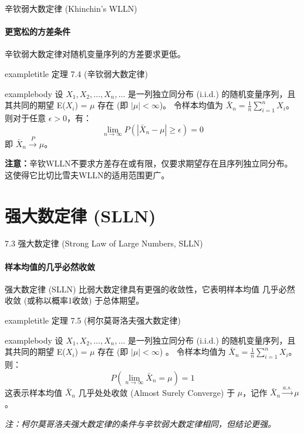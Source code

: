 \documentclass[UTF8]{beamer} %
\begin{document}
\begin{frame}{辛钦弱大数定律 (Khinchin's WLLN)}
    \framesubtitle{更宽松的方差条件}
    辛钦弱大数定律对随机变量序列的方差要求更低。
    \vspace{0.3cm}
    \begin{beamercolorbox}[sep=0.3cm,center,wd=\textwidth]{exampletitle}
        定理 7.4 (辛钦弱大数定律)
    \end{beamercolorbox}
    \begin{beamercolorbox}[sep=0.3cm,wd=\textwidth]{examplebody}
        设 $X_1, X_2, \dots, X_n, \dots$ 是一列\alert{独立同分布 (i.i.d.)} 的随机变量序列，且其共同的期望 E($X_i$) = $\mu$ \alert{存在} (即 $|\mu| < \infty$)。
        令样本均值为 $\bar{X}_n = \frac{1}{n} \sum_{i=1}^{n} X_i$。
        则对于任意 $\epsilon > 0$，有：
        \[ \lim_{n \to \infty} P(|\bar{X}_n - \mu| \geq \epsilon) = 0 \]
        即 $\bar{X}_n \xrightarrow{P} \mu$。
    \end{beamercolorbox}
    \vspace{0.3cm}
    \textbf{注意：}辛钦WLLN不要求方差存在或有限，仅要求期望存在且序列独立同分布。这使得它比切比雪夫WLLN的适用范围更广。
\end{frame}


\section{强大数定律 (SLLN)}
\begin{frame}{7.3 强大数定律 (Strong Law of Large Numbers, SLLN)}
    \framesubtitle{样本均值的几乎必然收敛}
    强大数定律 (SLLN) 比弱大数定律具有更强的收敛性，它表明样本均值 \alert{几乎必然收敛} (或称以概率1收敛) 于总体期望。
    \vspace{0.3cm}

    \begin{beamercolorbox}[sep=0.3cm,center,wd=\textwidth]{exampletitle}
        定理 7.5 (柯尔莫哥洛夫强大数定律)
    \end{beamercolorbox}
    \begin{beamercolorbox}[sep=0.3cm,wd=\textwidth]{examplebody}
        设 $X_1, X_2, \dots, X_n, \dots$ 是一列\alert{独立同分布 (i.i.d.)} 的随机变量序列，且其共同的期望 E($X_i$) = $\mu$ \alert{存在} (即 $|\mu| < \infty$) 。
        令样本均值为 $\bar{X}_n = \frac{1}{n} \sum_{i=1}^{n} X_i$。则：
        \[ P\left( \lim_{n \to \infty} \bar{X}_n = \mu \right) = 1 \]
        这表示样本均值 $\bar{X}_n$ \alert{几乎处处收敛} (Almost Surely Converge) 于 $\mu$，记作 $\bar{X}_n \xrightarrow{a.s.} \mu$。
    \end{beamercolorbox}
    \vspace{0.3cm}
    \footnotesize
    \textit{注：柯尔莫哥洛夫强大数定律的条件与辛钦弱大数定律相同，但结论更强。}
\end{frame}
\end{document}
